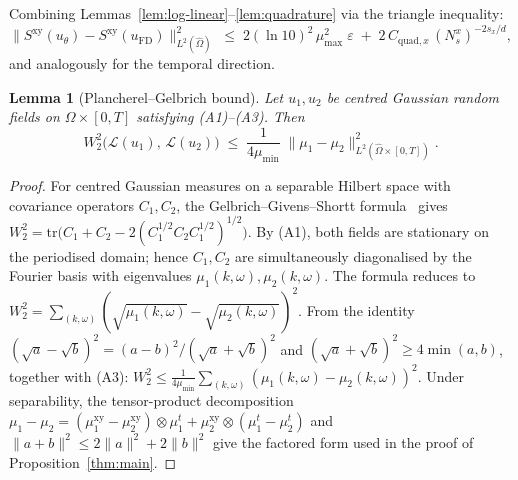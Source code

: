 \documentclass[review,12pt]{elsarticle}
\newtheorem{lemma}{Lemma}
\begin{document}
Combining Lemmas~\ref{lem:log-linear}--\ref{lem:quadrature} via
the triangle inequality:
\begin{equation}
\|S^{\mathrm{xy}}(u_\theta) - S^{\mathrm{xy}}(u_{\mathrm{FD}})
\|^2_{L^2(\widehat\Omega)}
\;\le\; 2(\ln 10)^2\,\mu_{\max}^2\;\varepsilon
\;+\; 2\,C_{\mathrm{quad},x}\,(N_s^x)^{-2s_x/d},
\label{eq:spectral-l2-bound}
\end{equation}
and analogously for the temporal direction.

\begin{lemma}[Plancherel--Gelbrich bound]
\label{lem:gelbrich}
Let \(u_1, u_2\) be centred Gaussian random fields on
\(\Omega \times [0,T]\) satisfying (A1)--(A3). Then
\[
W_2^2\bigl(\mathcal L(u_1),\,\mathcal L(u_2)\bigr)
\;\le\; \frac{1}{4\mu_{\min}}\;
\|\mu_1 - \mu_2\|^2_{L^2(\widehat\Omega \times [0,T])}.
\]
\end{lemma}
\begin{proof}
For centred Gaussian measures on a separable Hilbert space with
covariance operators \(C_1, C_2\), the Gelbrich--Givens--Shortt
formula~\cite{Gelbrich1990,GivensShortt1984} gives
\(W_2^2 = \mathrm{tr}\bigl(C_1 + C_2
- 2(C_1^{1/2} C_2 C_1^{1/2})^{1/2}\bigr)\).
By (A1), both fields are stationary on the periodised domain;
hence \(C_1, C_2\) are simultaneously diagonalised by the Fourier
basis with eigenvalues \(\mu_1(k,\omega), \mu_2(k,\omega)\). The
formula reduces to
\(W_2^2 = \sum_{(k,\omega)}
(\sqrt{\mu_1(k,\omega)} - \sqrt{\mu_2(k,\omega)})^2\).
From the identity
\((\sqrt a - \sqrt b)^2 = (a-b)^2/(\sqrt a + \sqrt b)^2\)
and \((\sqrt a + \sqrt b)^2 \ge 4\min(a,b)\), together with (A3):
\(W_2^2 \le \frac{1}{4\mu_{\min}}
\sum_{(k,\omega)} (\mu_1(k,\omega) - \mu_2(k,\omega))^2\).
Under separability, the tensor-product decomposition
\(\mu_1 - \mu_2 = (\mu_1^{\mathrm{xy}} - \mu_2^{\mathrm{xy}})
\otimes \mu_1^t + \mu_2^{\mathrm{xy}} \otimes
(\mu_1^t - \mu_2^t)\) and \(\|a+b\|^2 \le 2\|a\|^2 + 2\|b\|^2\)
give the factored form used in the proof of
Proposition~\ref{thm:main}.
\end{proof}
\end{document}
